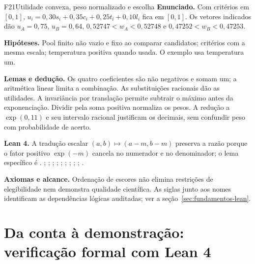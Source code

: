 \begin{formalizacao}{F21}{Utilidade convexa, peso normalizado e escolha}
\textbf{Enunciado.} Com critérios em $[0,1]$, $u_i=0{,}30s_i+0{,}35c_i+0{,}25t_i+0{,}10l_i$ fica em $[0,1]$. Os vetores indicados dão $u_A=0{,}75$, $u_B=0{,}64$, $0{,}52747<w_A<0{,}52748$ e $0{,}47252<w_B<0{,}47253$.

\textbf{Hipóteses.} Pool finito não vazio e fixo ao comparar candidatos; critérios com a mesma escala; temperatura positiva quando usada. O exemplo usa temperatura um.

\textbf{Lemas e dedução.} Os quatro coeficientes são não negativos e somam um; a aritmética linear limita a combinação. As substituições racionais dão as utilidades. A invariância por translação permite subtrair o máximo antes da exponenciação. Dividir pela soma positiva normaliza os pesos. A redução a $\exp(0{,}11)$ e seu intervalo racional justificam os decimais, sem confundir peso com probabilidade de acerto.

\textbf{Lean 4.} A tradução escalar $(a,b)\mapsto(a-m,b-m)$ preserva a razão porque o fator positivo $\exp(-m)$ cancela no numerador e no denominador; o lema específico é .  ; ; ; ; ; ; ; ; ; .

\textbf{Axiomas e alcance.} Ordenação de escores não elimina restrições de elegibilidade nem demonstra qualidade científica. As siglas junto aos nomes identificam as dependências lógicas auditadas; ver a seção~\ref{sec:fundamentos-lean}.
\end{formalizacao}




\section{Da conta à demonstração: verificação formal com Lean 4}
\label{sec:lean-livro}

